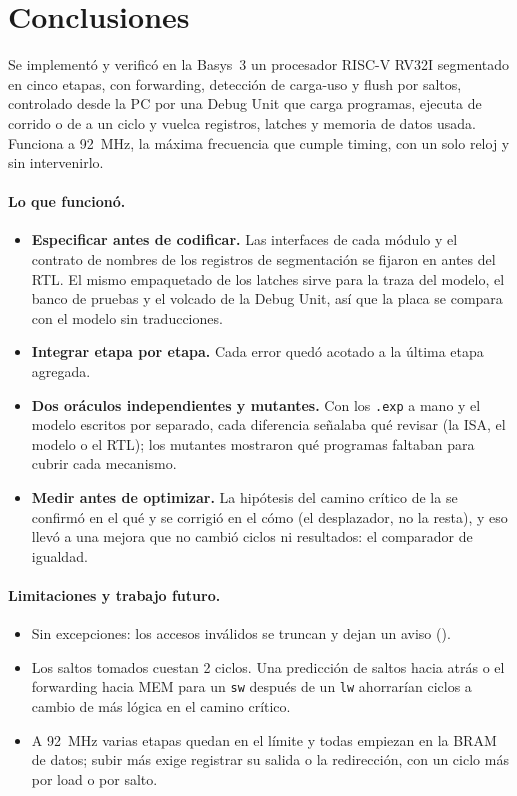 \section{Conclusiones}
\label{sec:conclusiones}

Se implementó y verificó en la Basys~3 un procesador RISC-V RV32I segmentado en cinco etapas, con
forwarding, detección de carga-uso y flush por saltos, controlado desde la PC por una Debug Unit que
carga programas, ejecuta de corrido o de a un ciclo y vuelca registros, latches y memoria de datos
usada. Funciona a \qty{92}{\mega\hertz}, la máxima frecuencia que cumple timing, con un solo reloj y
sin intervenirlo.

\paragraph{Lo que funcionó.}
\begin{itemize}[nosep]
  \item \textbf{Especificar antes de codificar.} Las interfaces de cada módulo y el contrato de
        nombres de los registros de segmentación se fijaron en  antes del RTL. El
        mismo empaquetado de los latches sirve para la traza del modelo, el banco de pruebas y el
        volcado de la Debug Unit, así que la placa se compara con el modelo sin traducciones.
  \item \textbf{Integrar etapa por etapa.} Cada error quedó acotado a la última etapa agregada.
  \item \textbf{Dos oráculos independientes y mutantes.} Con los \texttt{.exp} a mano y el
        modelo escritos por separado, cada diferencia señalaba qué revisar (la ISA, el modelo o el
        RTL); los mutantes mostraron qué programas faltaban para cubrir cada mecanismo.
  \item \textbf{Medir antes de optimizar.} La hipótesis del camino crítico de la  se
        confirmó en el qué y se corrigió en el cómo (el desplazador, no la resta), y eso llevó a una
        mejora que no cambió ciclos ni resultados: el comparador de igualdad.
\end{itemize}

\paragraph{Limitaciones y trabajo futuro.}
\begin{itemize}[nosep]
  \item Sin excepciones: los accesos inválidos se truncan y dejan un aviso ().
  \item Los saltos tomados cuestan 2 ciclos. Una predicción de saltos hacia atrás o el forwarding
        hacia MEM para un \texttt{sw} después de un \texttt{lw} ahorrarían ciclos a cambio de más
        lógica en el camino crítico.
  \item A \qty{92}{\mega\hertz} varias etapas quedan en el límite y todas empiezan en la BRAM de
        datos; subir más exige registrar su salida o la redirección, con un ciclo más por load o por
        salto.
\end{itemize}
